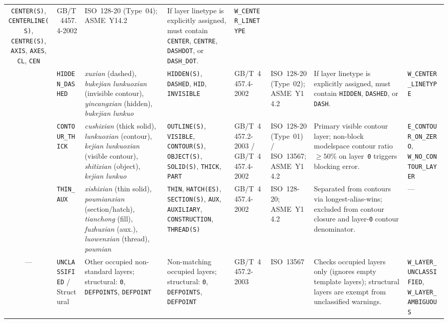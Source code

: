 \documentclass[nocopyright,nolists,upint,varvw,hyphenate]{asmejour}
\begin{document}
\begin{table}[t]
\begin{tabularx}{\textwidth}{c L{2.05cm} L{2.45cm} L{2.35cm} L{1.75cm} L{1.85cm} Y L{2.35cm}}
\texttt{CENTER(S)}, \texttt{CENTERLINE(S)}, \texttt{CENTRE(S)}, \texttt{AXIS}, \texttt{AXES}, \texttt{CL}, \texttt{CEN} &
GB/T~4457.4-2002 &
ISO~128-20 (Type~04); ASME~Y14.2 &
If layer linetype is explicitly assigned, must contain \texttt{CENTER}, \texttt{CENTRE}, \texttt{DASHDOT}, or \texttt{DASH\_DOT}. &
\texttt{W\_CENTER\_LINETYPE} \\
 & \texttt{HIDDEN\_DASHED} &
\emph{xuxian} (dashed), \emph{bukejian lunkuoxian} (invisible contour), \emph{yincangxian} (hidden), \emph{bukejian lunkuo} &
\texttt{HIDDEN(S)}, \texttt{DASHED}, \texttt{HID}, \texttt{INVISIBLE} &
GB/T~4457.4-2002 &
ISO~128-20 (Type~02); ASME~Y14.2 &
If layer linetype is explicitly assigned, must contain \texttt{HIDDEN}, \texttt{DASHED}, or \texttt{DASH}. &
\texttt{W\_CENTER\_LINETYPE} \\
 & \texttt{CONTOUR\_THICK} &
\emph{cushixian} (thick solid), \emph{lunkuoxian} (contour), \emph{kejian lunkuoxian} (visible contour), \emph{shitixian} (object), \emph{kejian lunkuo} &
\texttt{OUTLINE(S)}, \texttt{VISIBLE}, \texttt{CONTOUR(S)}, \texttt{OBJECT(S)}, \texttt{SOLID(S)}, \texttt{THICK}, \texttt{PART} &
GB/T~4457.2-2003 / GB/T~4457.4-2002 &
ISO~128-20 (Type~01) / ISO~13567; ASME~Y14.2 &
Primary visible contour layer; non-block modelspace contour ratio $\ge 50\%$ on layer~\texttt{0} triggers blocking error. &
\texttt{E\_CONTOUR\_ON\_ZERO}, \texttt{W\_NO\_CONTOUR\_LAYER} \\
 & \texttt{THIN\_AUX} &
\emph{xishixian} (thin solid), \emph{poumianxian} (section/hatch), \emph{tianchong} (fill), \emph{fuzhuxian} (aux.), \emph{luowenxian} (thread), \emph{poumian} &
\texttt{THIN}, \texttt{HATCH(ES)}, \texttt{SECTION(S)}, \texttt{AUX}, \texttt{AUXILIARY}, \texttt{CONSTRUCTION}, \texttt{THREAD(S)} &
GB/T~4457.4-2002 &
ISO~128-20; ASME~Y14.2 &
Separated from contours via longest-alias-wins; excluded from contour closure and layer-\texttt{0} contour denominator. &
--- \\
\addlinespace[2pt]
--- & \texttt{UNCLASSIFIED} / Structural &
Other occupied non-standard layers; structural: \texttt{0}, \texttt{DEFPOINTS}, \texttt{DEFPOINT} &
Non-matching occupied layers; structural: \texttt{0}, \texttt{DEFPOINTS}, \texttt{DEFPOINT} &
GB/T~4457.2-2003 &
ISO~13567 &
Checks occupied layers only (ignores empty template layers); structural layers are exempt from unclassified warnings. &
\texttt{W\_LAYER\_UNCLASSIFIED}, \texttt{W\_LAYER\_AMBIGUOUS} \\
\bottomrule
\end{tabularx}
\end{table}
\end{document}
